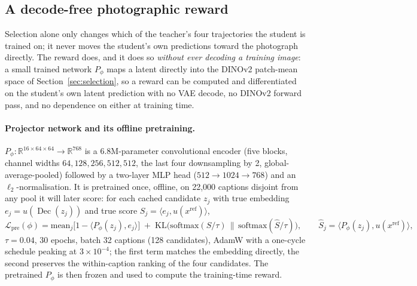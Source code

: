 \documentclass{article} %
\DeclareMathOperator{\Dec}{Dec}
\begin{document}
\subsection{A decode-free photographic reward}
\label{sec:reward}
Selection alone only changes which of the teacher's four trajectories the student is trained on; it
never moves the student's own predictions toward the photograph directly. The reward does, and it
does so \emph{without ever decoding a training image}: a small trained network $P_\phi$ maps a
latent directly into the DINOv2 patch-mean space of Section~\ref{sec:selection}, so a reward can be
computed and differentiated on the student's own latent prediction with no VAE decode, no DINOv2
forward pass, and no dependence on either at training time.

\paragraph{Projector network and its offline pretraining.} $P_\phi:\mathbb R^{16\times64\times64}\to\mathbb R^{768}$
is a 6.8M-parameter convolutional encoder (five blocks, channel widths $64,128,256,512,512$, the
last four downsampling by 2, global-average-pooled) followed by a two-layer MLP head
($512{\to}1024{\to}768$) and an $\ell_2$-normalisation. It is pretrained once, offline, on 22,000
captions disjoint from any pool it will later score: for each cached candidate $z_j$ with true
embedding $e_j=u(\Dec(z_j))$ and true score $S_j=\langle e_j,u(x^{\mathrm{ref}})\rangle$,
\begin{equation}
\mathcal L_{\mathrm{pre}}(\phi)=\mathrm{mean}_j\big[1-\langle P_\phi(z_j),e_j\rangle\big]\;+\;\mathrm{KL}\Big(\mathrm{softmax}(S/\tau)\,\big\|\,\mathrm{softmax}(\hat S/\tau)\Big),\qquad \hat S_j=\langle P_\phi(z_j),u(x^{\mathrm{ref}})\rangle,
\label{eq:projpretrain}
\end{equation}
$\tau{=}0.04$, 30 epochs, batch 32 captions (128 candidates), AdamW with a one-cycle schedule
peaking at $3\times10^{-4}$; the first term matches the embedding directly, the second preserves the
within-caption ranking of the four candidates. The pretrained $P_\phi$ is then frozen and used to
compute the training-time reward.
\end{document}
